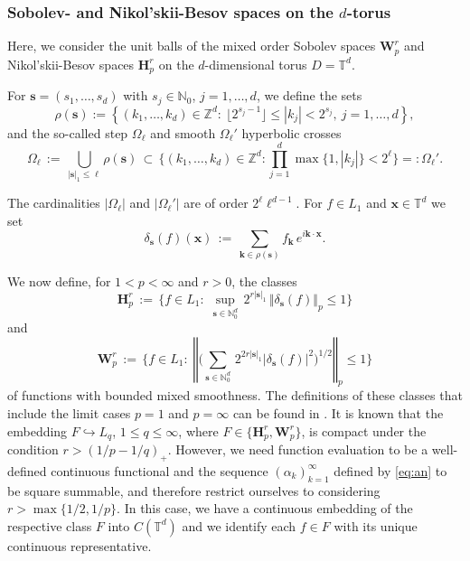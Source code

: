 \documentclass[a4paper,12pt]{amsart}
\theoremstyle{definition}
\theoremstyle{remark}
\newcommand{\norm}[1]{\left\Vert#1\right\Vert}
\newcommand{\abs}[1]{\left|#1\right|}
\newcommand{\bk}{\mathbf{k}}
\newcommand{\bx}{\mathbf{x}}
\begin{document}
\subsubsection{Sobolev- and 
Nikol'skii-Besov spaces
on the $d$-torus}


Here, we consider the unit balls of the mixed order Sobolev spaces $\mathbf{W}^r_p$ and 
Nikol'skii-Besov spaces $\mathbf{H}^r_p$ on the $d$-dimensional torus $D=\mathbb{T}^d$. 

For $\boldsymbol{s}=(s_1, \dots, s_d)$ with $s_j \in \mathbb{N}_0$, $j=1, \dots, d$, we define the sets
$$
\rho(\boldsymbol{s}):= \left\{ (k_1,\dots,k_d)\in \mathbb{Z}^d \colon \ \lfloor2^{s_j-1} \rfloor\leq \abs{k_j}< 2^{s_j}, \ j=1, \dots, d  \right\},
$$
and the so-called
step $\Omega_\ell$ and smooth $\Omega_\ell'$ hyperbolic crosses 
\[
  \Omega_\ell \,:=\, \bigcup_{\abs{\boldsymbol{s}}_1 \leq \ell }  \rho(\boldsymbol{s})
  \,
  \subset \, \bigg\{ (k_1,\dots,k_d) \in \mathbb{Z}^d\colon \prod_{j=1}^{d}\max \{1,  \abs{k_j}\}< 2^\ell   \bigg\} =: \Omega_\ell'.
\]

The cardinalities
$\abs{\Omega_\ell}$ and {$\abs{\Omega_\ell'}$ are}  
of order $2^\ell \ell^{d-1}$.
%
For $f \in L_1$ and $\bx\in\mathbb T^d$ we set 
$$
\delta_{\boldsymbol{s}} (f)(\bx) \,:=\,
\sum_{\bk \in \rho(\boldsymbol{s})} f_\bk \, e^{i \bk \cdot \bx}.
$$

We now define, for $1<p<\infty$ and $r>0$, the classes
 $$
\mathbf{H}^r_p \,:=\, \Big\{ f\in L_1
\colon \; \sup_{\boldsymbol{s}\in\mathbb{N}_0^d} \, 2^{r\abs{\boldsymbol{s}}_1}\,
\Vert \delta_{\boldsymbol{s}} (f) \Vert_{p}  \le1 \Big\}
$$
and 
 $$
\mathbf{W}^r_p \,:=\, \Bigg\{ f\in L_1
\colon \; \norm{\Big(\sum_{\boldsymbol{s}\in\mathbb{N}_0^d} \, 2^{2r\abs{\boldsymbol{s}}_1} 
\abs{\delta_{\boldsymbol{s}} (f)}^2 \Big)^{1/2}}_p \le1 \Bigg\}
$$
{of functions with bounded mixed 
smoothness.}
 The definitions of these classes that include the limit cases $p=1$ and $p=\infty$ can be found in \cite[Chapter~3]{DTU18}. 
It is known that the embedding 
$F\hookrightarrow L_q$,  {$1\le q \le \infty$,} where $F\in\{\mathbf{H}^r_p,  \mathbf{W}^r_p \}$, 
is compact under the condition 
$r> (1/p-1/q)_+$. However, we need function evaluation to be a well-defined continuous functional and the sequence   
$(\alpha_k)_{k =1}^\infty$
defined by \eqref{eq:an} to be square summable,  {and}
therefore restrict ourselves
 {to}
considering 
$r>\max \{1/2, 1/p\}$.
In this case, we have a continuous embedding of the respective class $F$ into $C(\mathbb{T}^d)$ and we identify each $f\in F$ with its unique continuous representative.
\end{document}
